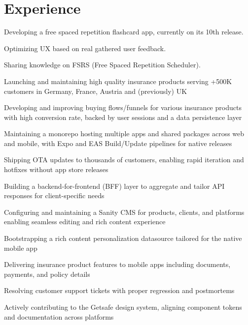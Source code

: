 \documentclass[]{deedy-resume-openfont}
\begin{document}
%
%
\begin{minipage}[t]{0.63\textwidth}


\section{Experience}
\sectionsep
{}
\subsectionsep{}
\vspace{\topsep} %
\begin{tightemize}
\item Developing a free spaced repetition flashcard app, currently on its 10th release.
\item Optimizing UX based on real gathered user feedback.
\item Sharing knowledge on FSRS (Free Spaced Repetition Scheduler).
\end{tightemize}
\sectionsep
\vspace{4pt}

\subsectionsep{}
\vspace{\topsep} %
\begin{tightemize}
\item Launching and maintaining high quality insurance products serving +500K customers in Germany, France, Austria and (previously) UK
\item Developing and improving buying flows/funnels for various insurance products with high conversion rate, backed by user sessions and a data persistence layer
\item Maintaining a monorepo hosting multiple apps and shared packages across web and mobile, with Expo and EAS Build/Update pipelines for native releases
\item Shipping OTA updates to thousands of customers, enabling rapid iteration and hotfixes without app store releases
\item Building a backend-for-frontend (BFF) layer to aggregate and tailor API responses for client-specific needs
\item Configuring and maintaining a Sanity CMS for products, clients, and platforms enabling seamless editing and rich content experience
\item Bootstrapping a rich content personalization datasource tailored for the native mobile app
\item Delivering insurance product features to mobile apps including documents, payments, and policy details
\item Resolving customer support tickets with proper regression and postmortems
\item Actively contributing to the Getsafe design system, aligning component tokens and documentation across platforms


\end{tightemize}
\end{minipage}
\end{document}
